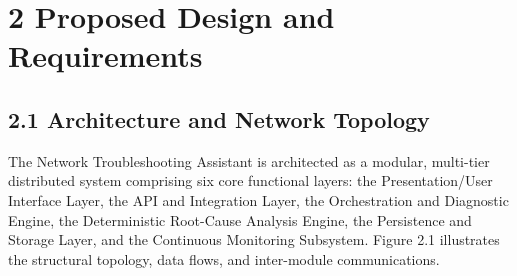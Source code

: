 \documentclass[
]{article}
\begin{document}
\newpage

\section{2 Proposed Design and Requirements}\label{proposed-design-and-requirements}

\subsection{2.1 Architecture and Network Topology}\label{architecture-and-network-topology}

The Network Troubleshooting Assistant is architected as a modular, multi-tier distributed system comprising six core functional layers: the Presentation/User Interface Layer, the API and Integration Layer, the Orchestration and Diagnostic Engine, the Deterministic Root-Cause Analysis Engine, the Persistence and Storage Layer, and the Continuous Monitoring Subsystem. Figure 2.1 illustrates the structural topology, data flows, and inter-module communications.

\vspace{0.4cm}
\end{document}
